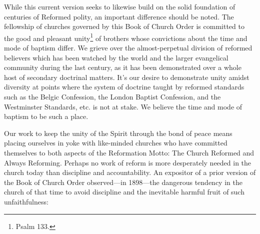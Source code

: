 \documentclass[
]{book}
\begin{document}
While this current version seeks to likewise build on the solid foundation of centuries of Reformed polity, an important difference should be noted. The fellowship of churches governed by this Book of Church Order is committed to the good and pleasant unity\footnote{Psalm 133.} of brothers whose convictions about the time and mode of baptism differ. We grieve over the almost-perpetual division of reformed believers which has been watched by the world and the larger evangelical community during the last century, as it has been demonstrated over a whole host of secondary doctrinal matters. It's our desire to demonstrate unity amidst diversity at points where the system of doctrine taught by reformed standards such as the Belgic Confession, the London Baptist Confession, and the Westminster Standards, etc. is not at stake. We believe the time and mode of baptism to be such a place.

Our work to keep the unity of the Spirit through the bond of peace means placing ourselves in yoke with like-minded churches who have committed themselves to both aspects of the Reformation Motto: The Church Reformed and Always Reforming. Perhaps no work of reform is more desperately needed in the church today than discipline and accountability. An expositor of a prior version of the Book of Church Order observed---in 1898---the dangerous tendency in the church of that time to avoid discipline and the inevitable harmful fruit of such unfaithfulness:
\end{document}
